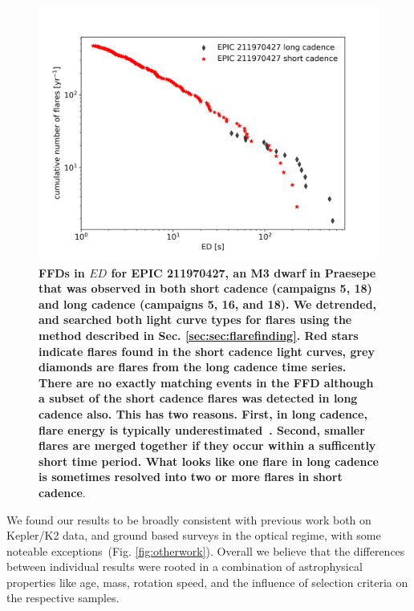 \documentclass{aa}
\begin{document}
\begin{figure}[ht!]
    \centering
    \includegraphics[width=\hsize]{pics/FFDs/EPIC211970427_long_vs_short_cadence_ffd.png}
    \caption{\textbf{FFDs in $ED$ for EPIC 211970427, an M3 dwarf in Praesepe that was observed in both short cadence (campaigns 5, 18) and long cadence (campaigns 5, 16, and 18). We detrended, and searched both light curve types for flares using the method described in Sec. \ref{sec:sec:flarefinding}. Red stars indicate flares found in the short cadence light curves, grey diamonds are flares from the long cadence time series. There are no exactly matching events in the FFD although a subset of the short cadence flares was detected in long cadence also. This has two reasons. First, in long cadence, flare energy is typically underestimated~\citep{yang_flaresampling_2018}. Second, smaller flares are merged together if they occur within a sufficently short time period. What looks like one flare in long cadence is sometimes resolved into two or more flares in short cadence}.}          
    \label{fig:shortlong}
\end{figure}
We found our results to be broadly consistent with previous work both on Kepler/K2 data, and ground based surveys in the optical regime, with some noteable exceptions~(Fig. \ref{fig:otherwork}). Overall we believe that the differences between individual results were rooted in a combination of astrophysical properties like age, mass, rotation speed, and the influence of selection criteria on the respective samples. 
\\
\end{document}
